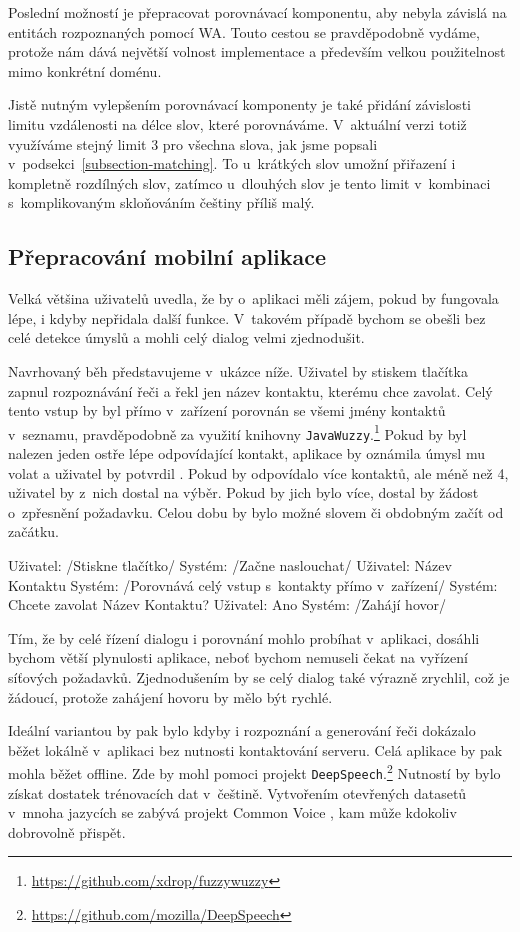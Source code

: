 Poslední možností je přepracovat porovnávací komponentu, aby nebyla závislá
na entitách rozpoznaných pomocí WA. Touto cestou se pravděpodobně vydáme,
protože nám dává největší volnost implementace a především velkou
použitelnost mimo konkrétní doménu.

Jistě nutným vylepšením porovnávací komponenty je také přidání závislosti
limitu vzdálenosti na délce slov, které porovnáváme. V~aktuální verzi
totiž využíváme stejný limit 3 pro všechna slova, jak jsme popsali
v~podsekci~\ref{subsection-matching}. To u~krátkých slov umožní
přiřazení i kompletně rozdílných slov, zatímco u~dlouhých
slov je tento limit v~kombinaci s~komplikovaným skloňováním češtiny
příliš malý.

\subsection{Přepracování mobilní aplikace}\label{better-app}

Velká většina uživatelů uvedla, že by o~aplikaci měli zájem, pokud by fungovala
lépe, i kdyby nepřidala další funkce. V~takovém případě bychom se obešli
bez celé detekce úmyslů a mohli celý dialog velmi zjednodušit.

Navrhovaný běh představujeme v~ukázce níže. Uživatel by stiskem
tlačítka zapnul rozpoznávání řeči a řekl jen název kontaktu,
kterému chce zavolat. Celý tento vstup by byl přímo v~zařízení
porovnán se všemi jmény kontaktů v~seznamu, pravděpodobně za
využití knihovny \texttt{JavaWuzzy}.\footnote{\url{https://github.com/xdrop/fuzzywuzzy}} Pokud by byl
nalezen jeden ostře lépe odpovídající kontakt, aplikace
by oznámila úmysl mu volat a uživatel by potvrdil .
Pokud by odpovídalo více kontaktů, ale méně než 4, uživatel
by z~nich dostal na výběr. Pokud by jich bylo více, dostal by
žádost o~zpřesnění požadavku. Celou dobu by bylo možné slovem
 či obdobným začít od začátku.
\begin{code}
    Uživatel: /Stiskne tlačítko/
    Systém:   /Začne naslouchat/
    Uživatel: Název Kontaktu
    Systém:   /Porovnává celý vstup s~kontakty přímo v~zařízení/
    Systém:   Chcete zavolat Název Kontaktu?
    Uživatel: Ano
    Systém:   /Zahájí hovor/
\end{code}

Tím, že by celé řízení dialogu i porovnání mohlo probíhat v~aplikaci,
dosáhli bychom větší plynulosti aplikace, neboť bychom nemuseli čekat
na vyřízení síťových požadavků. Zjednodušením by se celý dialog také
výrazně zrychlil, což je žádoucí, protože zahájení hovoru by mělo
být rychlé.

Ideální variantou by pak bylo kdyby i rozpoznání a generování řeči
dokázalo běžet lokálně v~aplikaci bez nutnosti kontaktování serveru.
Celá aplikace by pak mohla běžet offline. Zde by mohl pomoci projekt
\texttt{DeepSpeech}.\footnote{\url{https://github.com/mozilla/DeepSpeech}}
Nutností by bylo získat dostatek trénovacích dat v~češtině. Vytvořením
otevřených datasetů v~mnoha jazycích se zabývá projekt Common Voice \citep{commonvoice_2020},
kam může kdokoliv dobrovolně přispět.